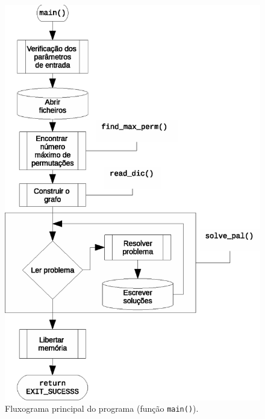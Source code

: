 \documentclass[portuguese, a4paper]{article}
\begin{document}
	\begin{figure}[H]
		\centering
		\includegraphics[width=0.70\linewidth]{main}
		\caption{Fluxograma principal do programa (função \texttt{main()}).}
		\label{geral}
	\end{figure}
\end{document}
